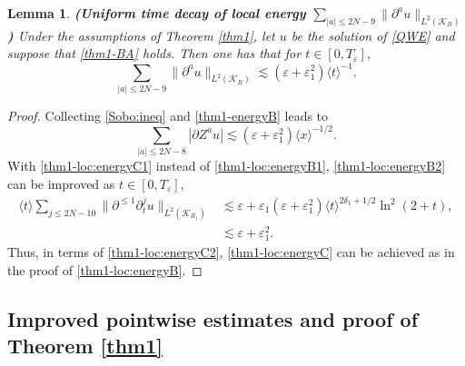 \documentclass[11pt,twoside]{article}
\def\cK{\mathcal K}
\def\p{\partial}
\def\ve{\varepsilon}
\def\ls{\lesssim}
\newcommand{\w}[1]{\langle {#1} \rangle}
\theoremstyle{plain}
\newtheorem{lemma}[theorem]{Lemma}
\theoremstyle{definition}
\numberwithin{equation}{section}
\begin{document}
\begin{lemma}
{\bf (Uniform time decay of local energy $\sum_{|a|\le2N-9}\|\p^au\|_{L^2(\cK_R)}$)}
Under the assumptions of Theorem \ref{thm1}, let $u$ be the solution of \eqref{QWE} and suppose that \eqref{thm1-BA} holds.
Then one has that for $t\in[0,T_\ve]$,
\begin{equation}\label{thm1-loc:energyC}
\sum_{|a|\le2N-9}\|\p^au\|_{L^2(\cK_R)}\ls(\ve+\ve_1^2)\w{t}^{-1}.
\end{equation}
\end{lemma}
\begin{proof}
Collecting \eqref{Sobo:ineq} and \eqref{thm1-energyB} leads to
\begin{equation}\label{thm1-loc:energyC1}
\sum_{|a|\le2N-8}|\p Z^au|\ls(\ve+\ve_1^2)\w{x}^{-1/2}.
\end{equation}
With \eqref{thm1-loc:energyC1} instead of \eqref{thm1-loc:energyB1}, \eqref{thm1-loc:energyB2} can be improved as $t\in[0,T_\ve]$,
\begin{equation}\label{thm1-loc:energyC2}
\begin{split}
\w{t}\sum_{j\le2N-10}\|\p^{\le1}\p_t^ju\|_{L^2(\cK_{R_1})}&\ls\ve+\ve_1(\ve+\ve_1^2)\w{t}^{2\delta_1+1/2}\ln^2(2+t),\\
&\ls\ve+\ve_1^2.
\end{split}
\end{equation}
Thus, in terms of \eqref{thm1-loc:energyC2}, \eqref{thm1-loc:energyC} can be achieved as in the proof of \eqref{thm1-loc:energyB}.
\end{proof}


\subsection{Improved pointwise estimates and proof of Theorem \ref{thm1}}
\end{document}
